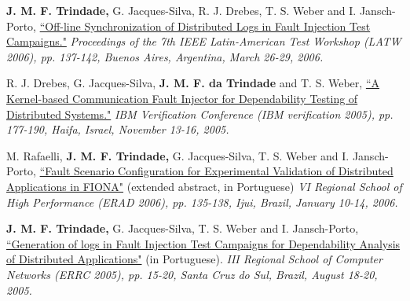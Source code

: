 \documentclass[line,margin]{res}
\begin{document}
\begin{resume}
\textbf{J. M. F. Trindade,} G. Jacques-Silva, R. J. Drebes, T. S. Weber and I. Jansch-Porto, \href{http://joanatrindade.wikidot.com/local--files/curriculum/latw2006.pdf}{``Off-line Synchronization of Distributed Logs in Fault Injection Test Campaigns."} \textit{Proceedings of the 7th IEEE Latin-American Test Workshop (LATW 2006), pp. 137-142, Buenos Aires, Argentina, March 26-29, 2006.}

R. J. Drebes, G. Jacques-Silva, \textbf{J. M. F. da Trindade} and T. S. Weber, \href{http://www.haifa.ibm.com/Workshops/PADTAD2005/papers/drebes.pdf}{``A Kernel-based Communication Fault Injector for Dependability Testing of Distributed Systems."} \textit{IBM Verification Conference (IBM verification 2005), pp. 177-190, Haifa, Israel, November 13-16, 2005.}

M. Rafaelli, \textbf{J. M. F. Trindade,} G. Jacques-Silva, T. S. Weber and I. Jansch-Porto, \href{http://joanatrindade.wikidot.com/local--files/curriculum/erad2006.pdf}{``Fault Scenario Configuration for Experimental Validation of Distributed Applications in FIONA"} (extended abstract, in Portuguese) \textit{VI Regional School of High Performance (ERAD 2006), pp. 135-138, Ijui, Brazil, January 10-14, 2006.}

\textbf{J. M. F. Trindade,} G. Jacques-Silva, T. S. Weber and I. Jansch-Porto, \href{http://joanatrindade.wikidot.com/local--files/curriculum/errc2005.pdf}{``Generation of logs in Fault Injection Test Campaigns for Dependability Analysis of Distributed Applications"} (in Portuguese). \textit{III Regional School of Computer Networks (ERRC 2005), pp. 15-20, Santa Cruz do Sul, Brazil, August 18-20, 2005.}


 

\end{resume}
\end{document}
